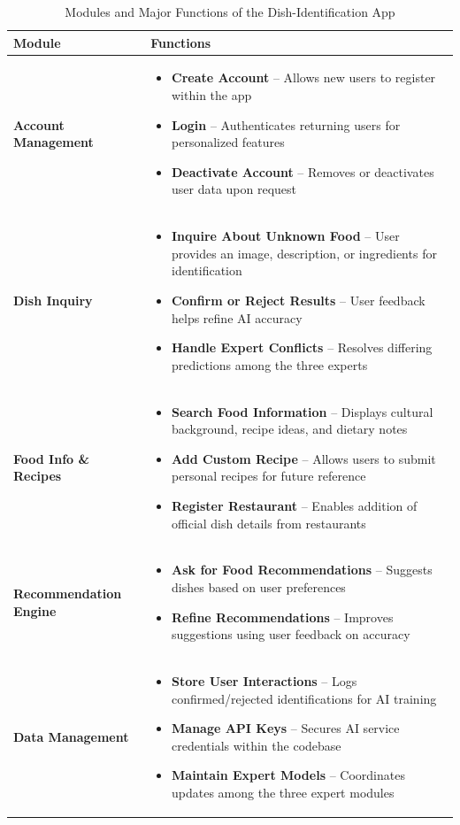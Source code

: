 \documentclass[]{article}
\begin{document}
\begin{table}[H]
\centering
\renewcommand{\arraystretch}{1.2} %
\begin{tabular}{|p{4cm}|p{10cm}|}
\hline
\textbf{Module} & \textbf{Functions} \\
\hline
\textbf{Account Management} &
\begin{itemize}
    \item \textbf{Create Account} – Allows new users to register within the app
    \item \textbf{Login} – Authenticates returning users for personalized features
    \item \textbf{Deactivate Account} – Removes or deactivates user data upon request
\end{itemize} \\
\hline
\textbf{Dish Inquiry} &
\begin{itemize}
    \item \textbf{Inquire About Unknown Food} – User provides an image, description, or ingredients for identification
    \item \textbf{Confirm or Reject Results} – User feedback helps refine AI accuracy
    \item \textbf{Handle Expert Conflicts} – Resolves differing predictions among the three experts
\end{itemize} \\
\hline
\textbf{Food Info \& Recipes} &
\begin{itemize}
    \item \textbf{Search Food Information} – Displays cultural background, recipe ideas, and dietary notes
    \item \textbf{Add Custom Recipe} – Allows users to submit personal recipes for future reference
    \item \textbf{Register Restaurant} – Enables addition of official dish details from restaurants
\end{itemize} \\
\hline
\textbf{Recommendation Engine} &
\begin{itemize}
    \item \textbf{Ask for Food Recommendations} – Suggests dishes based on user preferences
    \item \textbf{Refine Recommendations} – Improves suggestions using user feedback on accuracy
\end{itemize} \\
\hline
\textbf{Data Management} &
\begin{itemize}
    \item \textbf{Store User Interactions} – Logs confirmed/rejected identifications for AI training
    \item \textbf{Manage API Keys} – Secures AI service credentials within the codebase
    \item \textbf{Maintain Expert Models} – Coordinates updates among the three expert modules
\end{itemize} \\
\hline
\end{tabular}
\caption{Modules and Major Functions of the Dish-Identification App}
\label{tab:dish-functions}
\end{table}
\end{document}
